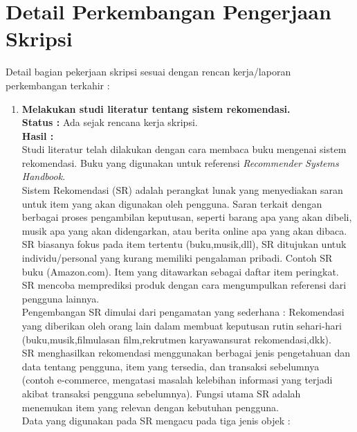 \documentclass[a4paper,twoside]{article}
\begin{document}
\section{Detail Perkembangan Pengerjaan Skripsi}
Detail bagian pekerjaan skripsi sesuai dengan rencan kerja/laporan perkembangan terkahir :
	\begin{enumerate}
		\item \textbf{
		Melakukan studi literatur tentang sistem rekomendasi.}\\
		{\bf Status :} Ada sejak rencana kerja skripsi.\\
		{\bf Hasil :} \\
		Studi literatur telah dilakukan dengan cara membaca buku mengenai sistem rekomendasi. Buku yang digunakan untuk referensi \textit{Recommender Systems Handbook}.\\
		Sistem Rekomendasi (SR) adalah perangkat lunak yang menyediakan saran untuk item yang akan digunakan oleh pengguna. Saran terkait dengan berbagai proses pengambilan keputusan, seperti barang apa yang akan dibeli, musik apa yang akan didengarkan, atau berita online apa yang akan dibaca.\\
		SR biasanya fokus pada item tertentu (buku,musik,dll), SR ditujukan untuk individu/personal yang kurang memiliki pengalaman pribadi. Contoh SR buku (Amazon.com). Item yang ditawarkan sebagai daftar item peringkat. SR mencoba memprediksi produk dengan cara mengumpulkan referensi dari pengguna lainnya.\\
		Pengembangan SR dimulai dari pengamatan yang sederhana : Rekomendasi yang diberikan oleh orang lain dalam membuat keputusan rutin sehari-hari (buku,musik,film{ulasan film},rekrutmen karyawan{surat rekomendasi},dkk).\\
		SR menghasilkan rekomendasi menggunakan berbagai jenis pengetahuan dan data tentang pengguna, item yang tersedia, dan transaksi sebelumnya (contoh e-commerce, mengatasi masalah kelebihan informasi yang terjadi akibat transaksi pengguna sebelumnya). Fungsi utama SR adalah menemukan item yang relevan dengan kebutuhan pengguna.\\
		
		Data yang digunakan pada SR mengacu pada tiga jenis objek :
		

\end{enumerate}
\end{document}
